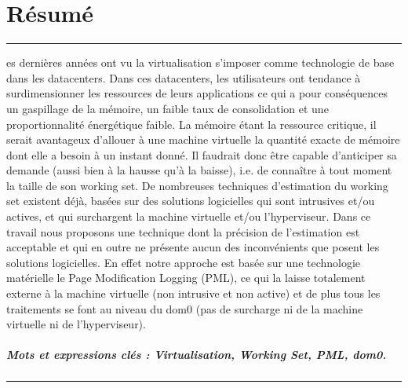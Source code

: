 %
%
%

\chapter*{Résumé}
{
\setstretch{}
\noindent\rule[3pt]{\textwidth}{1pt}
\vspace{.2cm}

es dernières années ont vu la virtualisation s'imposer comme technologie de base dans les datacenters. Dans ces datacenters, les utilisateurs ont tendance à surdimensionner les ressources de leurs applications ce qui a pour conséquences un gaspillage de la mémoire, un faible taux de consolidation et une proportionnalité énergétique faible. La mémoire étant la ressource critique, il serait avantageux d’allouer à une machine virtuelle la quantité exacte de mémoire dont elle a besoin à un instant donné. Il faudrait donc être capable d’anticiper sa demande (aussi bien à la hausse qu’à la baisse), i.e. de connaître à tout moment la taille de son working set. De nombreuses techniques d'estimation du working set existent déjà, basées sur des solutions logicielles qui sont intrusives et/ou actives, et qui surchargent la machine virtuelle et/ou l'hyperviseur. Dans ce travail nous proposons une technique dont la précision de l'estimation est acceptable et qui en outre ne présente aucun des inconvénients que posent les solutions logicielles. En effet notre approche est basée sur une technologie matérielle le Page Modification Logging (PML), ce qui la laisse totalement externe à la machine virtuelle (non intrusive et non active) et de plus tous les traitements se font au niveau du dom0 (pas de surcharge ni de la machine virtuelle ni de l'hyperviseur). 

\paragraph{Mots et expressions clés : Virtualisation, Working Set, PML, dom0.}

\vspace{.2cm}
\noindent\rule[3pt]{\textwidth}{1pt}
}
\clearpage